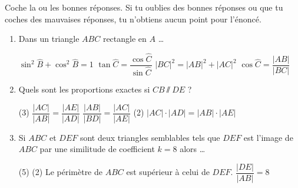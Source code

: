%
%
    Coche la ou les bonnes réponses. Si tu oublies des bonnes réponses ou que tu coches des mauvaises réponses, tu n'obtiens aucun point pour l'énoncé.
    \begin{enumerate}
        \item Dans un triangle $ABC$ rectangle en $A$ \dots
              \begin{QCM}
                  \choice $\sin^2\widehat{B} + \cos^2\widehat{B}=1$
                  \choice $\tan\widehat{C} = \dfrac{\cos\widehat{C}}{\sin\widehat{C}}$
                  \choice $|BC|^2 = |AB|^2 + |AC|^2$
                  \choice $\cos\widehat{C}=\dfrac{|AB|}{|BC|}$
              \end{QCM}
        \item Quels sont les proportions exactes si $CB\sslash DE$ ? 
              \begin{QCM}(3)
                  \choice $\dfrac{|AC|}{|AB|}=\dfrac{|AE|}{|AD|}$
                  \choice $\dfrac{|AB|}{|BD|}=\dfrac{|AC|}{|AE|}$
                  \choice*(2) $|AC|\cdot |AD| = |AB| \cdot |AE|$
              \end{QCM}
        \item Si $ABC$ et $DEF$ sont deux triangles semblables tels que $DEF$ est l'image de $ABC$ par une similitude de coefficient $k=8$ alors \dots
              \begin{QCM}(5)
                  \choice*(2) Le périmètre de $ABC$ est supérieur à celui de $DEF$.
                  \choice $\dfrac{|DE|}{|AB|}=8$

\end{QCM}
\end{enumerate}
